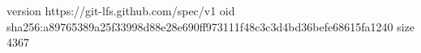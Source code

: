 version https://git-lfs.github.com/spec/v1
oid sha256:a89765389a25f33998d88e28e690ff973111f48c3c3d4bd36befe68615fa1240
size 4367
